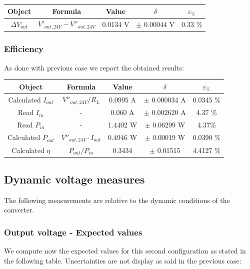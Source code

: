 \documentclass[../main.tex]{subfiles}
\begin{document}
\begin{center}
\begin{tabular}{c c c c c}
\textbf{Object} & \textbf{Formula} & \textbf{Value} & $\delta$ & $\varepsilon_{\%}$  \\
\hline
$\Delta V_{out}$ & $ V'_{out,24V} - V''_{out,24V} $ & 0.0134 V & $\pm$ 0.00044 V & 0.33 \%  \\ 
\end{tabular}
\end{center}

\subsubsection*{Efficiency}

As done with previous case we report the obtained results:

\begin{center}
\begin{tabular}{c c c c c}
\textbf{Object} & \textbf{Formula} & \textbf{Value} & $\delta$ & $\varepsilon_{\%}$ \\
\hline
Calculated $I_{out}$ & $V''_{out,24V} / R_L$ & 0.0995 A & $\pm$ 0.000034 A & 0.0345 \% \\ 
\hline
Read $I_{in}$ & - & 0.060 A & $\pm$ 0.002620 A &  4.37 \% \\ 
\hline
Read $P_{in}$ & - & 1.4402 W & $\pm$ 0.06299 W & 4.37\%\\ 
\hline
Calculated $P_{out}$ & $V''_{out,24V} \cdot I_{out}$ &  0.4946 W & $\pm$ 0.00019  W &  0.0390 \% \\ 
\hline
Calculated $\eta$ & $P_{out}/P_{in}$ & 0.3434 & $\pm$ 0.01515  &  4.4127 \%  \\ 
\end{tabular}
\end{center}

\subsection*{Dynamic voltage measures}

The following measurements are relative to the dynamic conditions of the converter.

\subsubsection*{Output voltage - Expected values}

We compute now the expected values for this second configuration as stated in the following table. Uncertainties are not display as said in the previous case:
\end{document}
